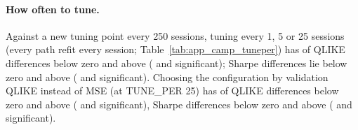 \paragraph{How often to tune.} Against a new tuning point every 250 sessions, tuning every 1,
5 or 25 sessions (every path refit every session; Table~\ref{tab:app_camp_tuneper}) has
\campTPQBelow{} of \campTPN{} QLIKE differences below zero and
\campTPQAbove{} above (\campTPQBelowSig{} and \campTPQAboveSig{} significant);
\campTPSBelow{} Sharpe differences lie below zero and \campTPSAbove{} above
(\campTPSBelowSig{} and \campTPSAboveSig{} significant). Choosing the configuration by
validation QLIKE instead of MSE (at TUNE\_PER 25) has \campTPRuleQBelow{} of
\campTPRuleN{} QLIKE differences below zero and \campTPRuleQAbove{} above
(\campTPRuleQBelowSig{} and \campTPRuleQAboveSig{} significant), \campTPRuleSBelow{}
Sharpe differences below zero and \campTPRuleSAbove{} above (\campTPRuleSBelowSig{} and
\campTPRuleSAboveSig{} significant).

